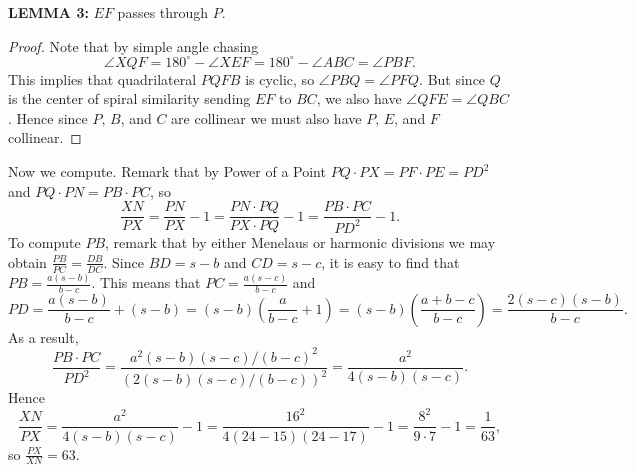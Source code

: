 \documentclass[10pt]{article}
\newcounter{enum}
\begin{document}
\begin{enumerate}
\par\textbf{LEMMA 3:} $EF$ passes through $P$.

\begin{proof}Note that by simple angle chasing \[\angle XQF=180^\circ-\angle XEF=180^\circ-\angle ABC=\angle PBF.\] This implies that quadrilateral $PQFB$ is cyclic, so $\angle PBQ=\angle PFQ$.  But since $Q$ is the center of spiral similarity sending $EF$ to $BC$, we also have $\angle QFE=\angle QBC$.  Hence since $P$, $B$, and $C$ are collinear we must also have $P$, $E$, and $F$ collinear.  
\end{proof}

Now we compute.  Remark that by Power of a Point $PQ\cdot PX=PF\cdot PE=PD^2$ and $PQ\cdot PN=PB\cdot PC$, so \[\dfrac{XN}{PX}=\dfrac{PN}{PX}-1=\dfrac{PN\cdot PQ}{PX\cdot PQ} - 1 = \dfrac{PB\cdot PC}{PD^2}-1.\] To compute $PB$, remark that by either Menelaus or harmonic divisions we may obtain $\tfrac{PB}{PC}=\tfrac{DB}{DC}$.  Since $BD=s-b$ and $CD=s-c$, it is easy to find that $PB=\tfrac{a(s-b)}{b-c}$.  This means that $PC=\tfrac{a(s-c)}{b-c}$ and \[PD=\dfrac{a(s-b)}{b-c}+(s-b)=(s-b)\left(\dfrac{a}{b-c}+1\right)=(s-b)\left(\dfrac{a+b-c}{b-c}\right)=\dfrac{2(s-c)(s-b)}{b-c}.\] As a result, \[\dfrac{PB\cdot PC}{PD^2}=\dfrac{a^2(s-b)(s-c)/(b-c)^2}{(2(s-b)(s-c)/(b-c))^2}=\frac{a^2}{4(s-b)(s-c)}.\] Hence \[\dfrac{XN}{PX}=\dfrac{a^2}{4(s-b)(s-c)}-1=\dfrac{16^2}{4(24-15)(24-17)}-1=\dfrac{8^2}{9\cdot 7}-1=\dfrac{1}{63},\] so $\tfrac{PX}{XN}=\boxed{63}$.

\end{enumerate}
\end{document}
